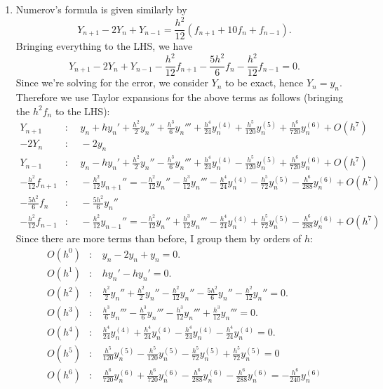 \documentclass[11pt]{article}
\def\f{\frac }
\newcommand{\oh}[1]{O(h^{{#1}})}
\begin{document}
\begin{enumerate}
\begin{enumerate}
\item Numerov's formula is given similarly by
\[ Y_{n+1} -2 Y_{n} + Y_{n-1} = \f{h^2}{12} \left ( f_{n+1} + 10 f_{n} + f_{n-1} \right ).\]
Bringing everything to the LHS, we have
\[ Y_{n+1} -2 Y_{n} + Y_{n-1} -\f{h^2}{12} f_{n+1} - \f{5 h^2}{6} f_{n} -\f{h^2}{12}  f_{n-1}  = 0.\]
Since we're solving for the error, we consider $Y_n$ to be exact, hence $Y_n = y_n$.
Therefore we use Taylor expansions for the above terms as follows (bringing the $h^2f_n$ to the LHS):
\begin{align*} Y_{n+1} &:~~~~~ y_n + hy_n' + \f{h^2}{2} y_n'' + \f{h^3}{6} y_n ''' + \f{h^4}{24} y_n^{(4)} + \f{h^5}{120} y_n^{(5)} + \f{h^6}{720} y_n^{(6)} + \oh{7} \\
-2Y_{n} &:~~~~~ -2y_n\\
Y_{n-1} &:~~~~~ y_n - hy_n' + \f{h^2}{2} y_n'' - \f{h^3}{6} y_n ''' + \f{h^4}{24} y_n^{(4)} - \f{h^5}{120} y_n^{(5)} + \f{h^6}{720} y_n^{(6)} + \oh{7} \\
-\f{h^2}{12}f_{n+1} &:~~~~~ -\f{h^2}{12}y_{n+1}'' =  -\f{h^2}{12}y_n'' -\f{h^3}{12}y_n''' - \f{h^4}{24} y_n^{(4)} - \f{h^5}{72} y_n ^{(5)} - \f{h^6}{288} y_n^{(6)} + \oh{7}\\
- \f{5h^2}{6}f_{n} &:~~~~~ - \f{5h^2}{6}y_{n}''\\
-\f{h^2}{12}f_{n-1} &:~~~~~ - \f{h^2}{12}y_{n-1}'' =  -\f{h^2}{12}y_n'' +\f{h^3}{12}y_n''' - \f{h^4}{24} y_n^{(4)} +\f{h^5}{72} y_n ^{(5)} - \f{h^6}{288} y_n^{(6)} + \oh{7}\end{align*}
Since there are more terms than before, I group them by orders of $h$:
\begin{align*} \oh{0}&:~~~~y_n -2y_n + y_n = 0.\\
\oh{1}&:~~~~hy_n' - hy_n' = 0.\\
\oh{2}&:~~~~\f{h^2}{2} y_n'' + \f{h^2}{2} y_n'' -\f{h^2}{12}y_n'' -\f{5h^2}{6}y_n'' -\f{h^2}{12}y_n''= 0.\\
\oh{3}&:~~~~\f{h^3}{6} y_n''' - \f{h^3}{6} y_n''' -\f{h^3}{12}y_n''' + \f{h^3}{12}y_n'''= 0.\\
\oh{4}&:~~~~\f{h^4}{24} y_n^{(4)} + \f{h^4}{24} y_n^{(4)} - \f{h^4}{24} y_n^{(4)} - \f{h^4}{24} y_n^{(4)} = 0.\\
\oh{5}&:~~~~ \f{h^5}{120} y_n^{(5)} - \f{h^5}{120} y_n^{(5)} - \f{h^5}{72} y_n ^{(5)} + \f{h^5}{72} y_n ^{(5)}= 0\\
\oh{6}&:~~~~\f{h^6}{720} y_n^{(6)} + \f{h^6}{720} y_n^{(6)} - \f{h^6}{288} y_n^{(6)}  - \f{h^6}{288} y_n^{(6)} = -\f{h^6}{240} y_n ^{(6)}\end{align*}


\end{enumerate}
\end{enumerate}
\end{document}
